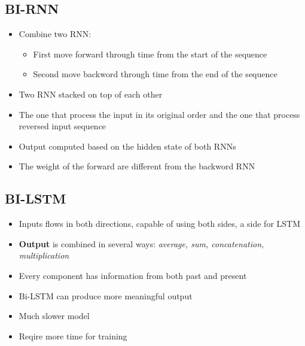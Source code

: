 \subsection{BI-RNN}
\begin{itemize}
    \item Combine two RNN:
    \begin{itemize}
        \item First move forward through time from the start of the sequence 
        \item Second move backword through time from the end of the sequence
    \end{itemize}
    \item Two RNN stacked on top of each other
    \item The one that process the input in its original order and the one that process reversed input sequence
    \item Output computed based on the hidden state of both RNNs
    \item The weight of the forward are different from the backword RNN
\end{itemize}

\subsection{BI-LSTM}
\begin{itemize}
    \item Inputs flows in both directions, capable of using both sides, a side for LSTM
    \item \textbf{Output} is combined in several ways: \textit{average, sum, concatenation, multiplication} 
    \item Every component has information from both past and present
    \item Bi-LSTM can produce more meaningful output
    \item Much slower model
    \item Reqire more time for training
\end{itemize}


